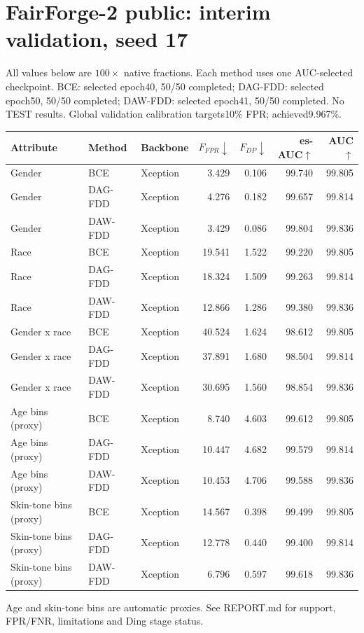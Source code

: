 \documentclass{article}
\begin{document}
\section*{FairForge-2 public: interim validation, seed 17}
All values below are $100\times$ native fractions. Each method uses one AUC-selected checkpoint.
BCE: selected epoch40, 50/50 completed; DAG-FDD: selected epoch50, 50/50 completed; DAW-FDD: selected epoch41, 50/50 completed.
No TEST results. Global validation calibration targets10\% FPR; achieved9.967\%.
\begin{center}\begin{tabular}{lllrrrr}\toprule
Attribute & Method & Backbone & $F_{FPR}\downarrow$ & $F_{DP}\downarrow$ & es-AUC$\uparrow$ & AUC$\uparrow$ \\ \midrule
Gender & BCE & Xception & 3.429 & 0.106 & 99.740 & 99.805 \\
Gender & DAG-FDD & Xception & 4.276 & 0.182 & 99.657 & 99.814 \\
Gender & DAW-FDD & Xception & 3.429 & 0.086 & 99.804 & 99.836 \\
\midrule
Race & BCE & Xception & 19.541 & 1.522 & 99.220 & 99.805 \\
Race & DAG-FDD & Xception & 18.324 & 1.509 & 99.263 & 99.814 \\
Race & DAW-FDD & Xception & 12.866 & 1.286 & 99.380 & 99.836 \\
\midrule
Gender x race & BCE & Xception & 40.524 & 1.624 & 98.612 & 99.805 \\
Gender x race & DAG-FDD & Xception & 37.891 & 1.680 & 98.504 & 99.814 \\
Gender x race & DAW-FDD & Xception & 30.695 & 1.560 & 98.854 & 99.836 \\
\midrule
Age bins (proxy) & BCE & Xception & 8.740 & 4.603 & 99.612 & 99.805 \\
Age bins (proxy) & DAG-FDD & Xception & 10.447 & 4.682 & 99.579 & 99.814 \\
Age bins (proxy) & DAW-FDD & Xception & 10.453 & 4.706 & 99.588 & 99.836 \\
\midrule
Skin-tone bins (proxy) & BCE & Xception & 14.567 & 0.398 & 99.499 & 99.805 \\
Skin-tone bins (proxy) & DAG-FDD & Xception & 12.778 & 0.440 & 99.400 & 99.814 \\
Skin-tone bins (proxy) & DAW-FDD & Xception & 6.796 & 0.597 & 99.618 & 99.836 \\
\bottomrule\end{tabular}\end{center}
Age and skin-tone bins are automatic proxies. See REPORT.md for support, FPR/FNR, limitations and Ding stage status.
\end{document}
